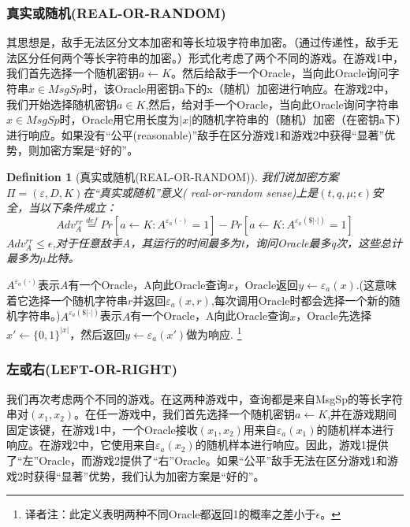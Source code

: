 \documentclass[]{article}
\newtheorem{definition}{Definition}
\begin{document}
\subsubsection{真实或随机(REAL-OR-RANDOM)}

其思想是，敌手无法区分文本加密和等长垃圾字符串加密。（通过传递性，敌手无法区分任何两个等长字符串的加密。）形式化考虑了两个不同的游戏。在游戏1中，我们首先选择一个随机密钥$a\leftarrow K$。然后给敌手一个Oracle，当向此Oracle询问字符串$x\in MsgSp$时，该Oracle用密钥a下的x（随机）加密进行响应。在游戏2中，我们开始选择随机密钥$a\in K$,然后，给对手一个Oracle，当向此Oracle询问字符串$x\in MsgSp$时，Oracle用它用长度为$|x|$的随机字符串的（随机）加密（在密钥a下）进行响应。如果没有“公平(reasonable)”敌手在区分游戏1和游戏2中获得“显著”优势，则加密方案是“好的”。\par

\begin{definition}[真实或随机(REAL-OR-RANDOM)]
	我们说加密方案$\Pi =(\varepsilon,D,K)$在“真实或随机”意义( real-or-random sense)上是$(t,q,\mu;\epsilon)$安全，当以下条件成立：
	\[Adv_A^{rr} \stackrel{def}{=} Pr[a\leftarrow K:A^{\varepsilon_a(\cdot)}=1] - Pr[a\leftarrow K : A^{\varepsilon_a(\$|\cdot|)}=1]\]
	$Adv_A^{rr} \leq \epsilon$,对于任意敌手A，其运行的时间最多为t，询问Oracle最多q次，这些总计最多为$\mu$比特。
\end{definition}

$A^{\varepsilon_a(\cdot)}$表示$A$有一个Oracle，A向此Oracle查询$x$，Oracle返回$y\leftarrow \varepsilon_a(x)$.(这意味着它选择一个随机字符串$r$并返回$\varepsilon_a (x,r)$,每次调用Oracle时都会选择一个新的随机字符串。)$A^{\varepsilon_a(\$|\cdot|)}$表示$A$有一个Oracle，A向此Oracle查询$x$，Oracle先选择$x'\leftarrow \{0,1\}^{|x|}$，然后返回$y\leftarrow \varepsilon_a(x')$做为响应.
\footnote{译者注：此定义表明两种不同Oracle都返回1的概率之差小于$\epsilon$。}

\subsubsection{左或右(LEFT-OR-RIGHT)}
我们再次考虑两个不同的游戏。在这两种游戏中，查询都是来自MsgSp的等长字符串对$(x_1,x_2)$。在任一游戏中，我们首先选择一个随机密钥$a\leftarrow K$,并在游戏期间固定该键，在游戏1中，一个Oracle接收$(x_1,x_2)$用来自$\varepsilon_a(x_1)$的随机样本进行响应。在游戏2中，它使用来自$\varepsilon_a(x_2)$的随机样本进行响应。因此，游戏1提供了“左”Oracle，而游戏2提供了“右”Oracle。如果“公平”敌手无法在区分游戏1和游戏2时获得“显著”优势，我们认为加密方案是“好的”。
\end{document}
